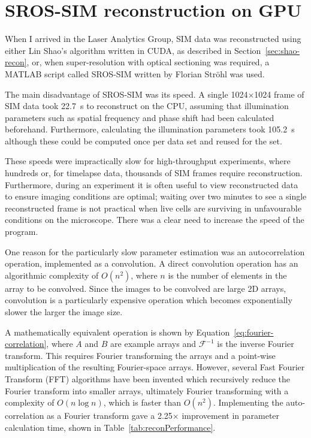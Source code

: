 \section{SROS-SIM reconstruction on GPU} \label{appx:gpu-srossim}
When I arrived in the Laser Analytics Group, SIM data was reconstructed using either Lin Shao's algorithm written in CUDA, as described in Section~\ref{sec:shao-recon}, or, when super-resolution with optical sectioning was required, a MATLAB script called SROS-SIM written by Florian Str{\"o}hl was used. 

The main disadvantage of SROS-SIM was its speed. 
A single 1024$\times$1024 frame of SIM data took \SI{22.7}{\second} to reconstruct on the CPU, assuming that illumination parameters such as spatial frequency and phase shift had been calculated beforehand. 
Furthermore, calculating the illumination parameters took \SI{105.2}{\second} although these could be computed once per data set and reused for the set. 

These speeds were impractically slow for high-throughput experiments, where hundreds or, for timelapse data, thousands of SIM frames require reconstruction. 
Furthermore, during an experiment it is often useful to view reconstructed data to ensure imaging conditions are optimal; waiting over two minutes to see a single reconstructed frame is not practical when live cells are surviving in unfavourable conditions on the microscope. 
There was a clear need to increase the speed of the program.

One reason for the particularly slow parameter estimation was an autocorrelation operation, implemented as a convolution.
A direct convolution operation has an algorithmic complexity of $O(n^2)$, where $n$ is the number of elements in the array to be convolved. 
Since the images to be convolved are large 2D arrays, convolution is a particularly expensive operation which becomes exponentially slower the larger the image size. 

A mathematically equivalent operation is shown by Equation~\ref{eq:fourier-correlation}, where $A$ and $B$ are example arrays and $\mathcal{F}^{-1}$ is the inverse Fourier transform. 
This requires Fourier transforming the arrays and a point-wise multiplication of the resulting Fourier-space arrays.
However, several Fast Fourier Transform (FFT) algorithms have been invented which recursively reduce the Fourier transform into smaller arrays, ultimately Fourier transforming with a complexity of $O(n\log n)$, which is faster than $O(n^2)$. 
Implementing the auto-correlation as a Fourier transform gave a 2.25$\times$ improvement in parameter calculation time, shown in Table~\ref{tab:reconPerformance}. 

